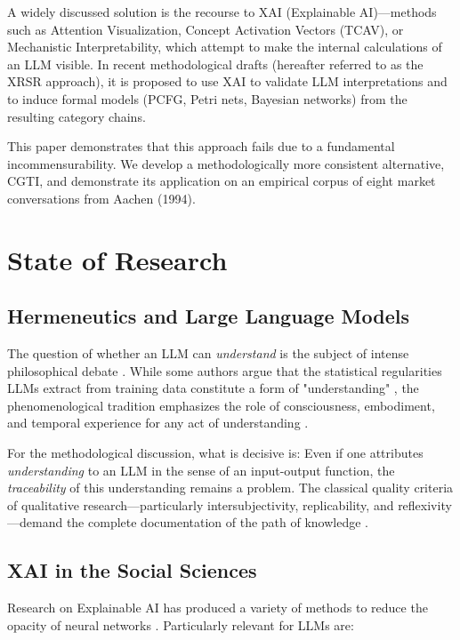 \documentclass[12pt,a4paper]{article}
\begin{document}
A widely discussed solution is the recourse to XAI (Explainable AI)—methods such as Attention Visualization, Concept Activation Vectors (TCAV), or Mechanistic Interpretability, which attempt to make the internal calculations of an LLM visible. In recent methodological drafts (hereafter referred to as the XRSR approach), it is proposed to use XAI to validate LLM interpretations and to induce formal models (PCFG, Petri nets, Bayesian networks) from the resulting category chains.

This paper demonstrates that this approach fails due to a fundamental incommensurability. We develop a methodologically more consistent alternative, CGTI, and demonstrate its application on an empirical corpus of eight market conversations from Aachen (1994).

\section{State of Research}

\subsection{Hermeneutics and Large Language Models}

The question of whether an LLM can \textit{understand} is the subject of intense philosophical debate \cite{searle1980minds, bender2021dangers}. While some authors argue that the statistical regularities LLMs extract from training data constitute a form of "understanding" \cite{chalmers2023does}, the phenomenological tradition emphasizes the role of consciousness, embodiment, and temporal experience for any act of understanding \cite{gadamer1960wahrheit, heidegger1927sein}.

For the methodological discussion, what is decisive is: Even if one attributes \textit{understanding} to an LLM in the sense of an input-output function, the \textit{traceability} of this understanding remains a problem. The classical quality criteria of qualitative research—particularly intersubjectivity, replicability, and reflexivity—demand the complete documentation of the path of knowledge \cite{steinke2004gütekriterien, lincoln1985naturalistic}.

\subsection{XAI in the Social Sciences}

Research on Explainable AI has produced a variety of methods to reduce the opacity of neural networks \cite{guidotti2018survey}. Particularly relevant for LLMs are:
\end{document}
